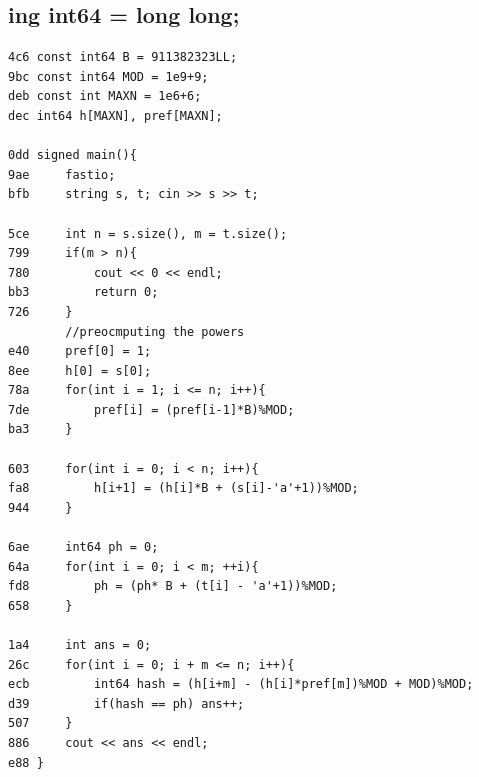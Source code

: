 \documentclass[11pt, a4paper, twoside]{article}
\begin{document}
\subsection{ing int64 = long long;}
\begin{lstlisting}
4c6 const int64 B = 911382323LL;
9bc const int64 MOD = 1e9+9;
deb const int MAXN = 1e6+6;
dec int64 h[MAXN], pref[MAXN];
 
0dd signed main(){
9ae 	fastio;
bfb 	string s, t; cin >> s >> t;
     
5ce     int n = s.size(), m = t.size();
799     if(m > n){
780         cout << 0 << endl;
bb3         return 0;
726     }
        //preocmputing the powers
e40     pref[0] = 1;
8ee     h[0] = s[0];
78a     for(int i = 1; i <= n; i++){
7de         pref[i] = (pref[i-1]*B)%MOD;
ba3     }
     
603     for(int i = 0; i < n; i++){
fa8         h[i+1] = (h[i]*B + (s[i]-'a'+1))%MOD;
944     }
     
6ae     int64 ph = 0;
64a     for(int i = 0; i < m; ++i){
fd8         ph = (ph* B + (t[i] - 'a'+1))%MOD;
658     }
     
1a4     int ans = 0;
26c     for(int i = 0; i + m <= n; i++){
ecb         int64 hash = (h[i+m] - (h[i]*pref[m])%MOD + MOD)%MOD;
d39         if(hash == ph) ans++;
507     }
886     cout << ans << endl;
e88 }
\end{lstlisting}
\end{document}
